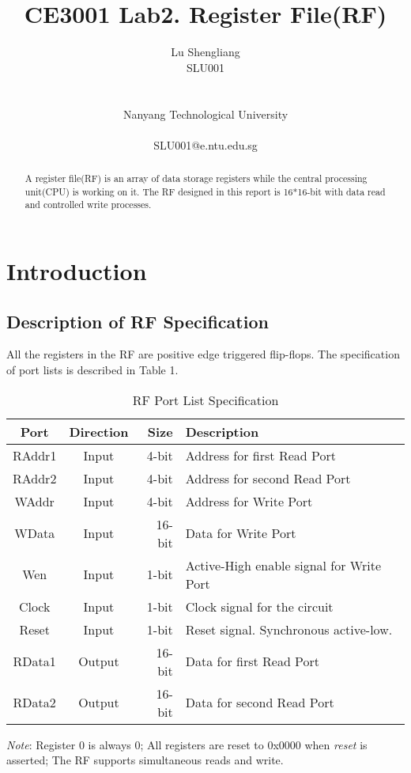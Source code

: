 \documentclass[12pt,fleqn]{article}
\title{CE3001 Lab2. Register File(RF)}
\author{
  Lu Shengliang \\
  SLU001\\
  \Organization{} \\
  \vspace*{-10mm} \\
  Nanyang Technological University \\
  \vspace*{-10mm} \\
  SLU001@e.ntu.edu.sg
}
\begin{document}
\maketitle

\begin{abstract}
A register file(RF) is an array of data storage registers while the central processing unit(CPU) is working on it. The RF designed in this report is 16*16-bit with data read and controlled write processes.
\end{abstract}



\section{Introduction}

\label{sec:intro}

\subsection{Description of RF Specification} 
All the registers in the RF are positive edge triggered flip-flops. The specification of port lists is described in Table 1.
\begin{table}
  \begin{tabular}{| c | c | r | l |}
    \hline
    \textbf{Port} & \textbf{Direction} & \textbf{Size} & \textbf{Description}\\ \hline
    RAddr1 & Input & 4-bit & Address for first Read Port\\
    \hline
    RAddr2 & Input & 4-bit & Address for second Read Port\\
    \hline
    WAddr & Input & 4-bit & Address for Write Port\\
    \hline
    WData & Input & 16-bit & Data for Write Port\\
    \hline
    Wen & Input & 1-bit & Active-High enable signal for Write Port\\
    \hline
    Clock & Input & 1-bit & Clock signal for the circuit\\
    \hline
    Reset & Input & 1-bit & Reset signal. Synchronous active-low.\\
    \hline
    RData1 & Output & 16-bit & Data for first Read Port\\
    \hline
    RData2 & Output & 16-bit & Data for second Read Port\\
    \hline
  \end{tabular}
  
  \begin{tablenotes}
    \emph{Note}: Register 0 is always 0; All registers are reset to 0x0000 when \emph{reset} is asserted; The RF supports simultaneous reads and write.
  \end{tablenotes}
  \caption{RF Port List Specification}
\end{table}
\end{document}
